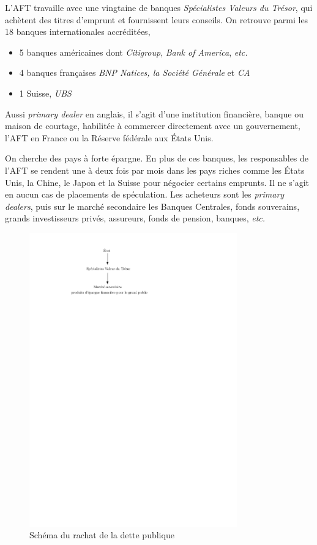 \documentclass[main.tex]{subfiles}
\begin{document}
L'AFT travaille avec une vingtaine de banques \emph{Spécialistes Valeurs du Trésor}, qui achètent des titres d'emprunt et fournissent leurs conseils. On retrouve parmi les 18 banques internationales accréditées,
\begin{itemize}
        \item 5 banques américaines dont \emph{Citigroup}, \emph{Bank of America}, \textit{etc.}
        \item 4 banques françaises \emph{BNP Natices, la Société Générale} et \emph{CA}
        \item 1 Suisse, \emph{UBS} 
\end{itemize}

\begin{definition}
        Aussi \emph{primary dealer} en anglais, il s'agit d'une institution financière, banque ou maison de courtage, habilitée à commercer directement avec un gouvernement, l'AFT en France ou la Réserve fédérale aux États Unis.
\end{definition}

        On cherche des pays à forte épargne. En plus de ces banques, les responsables de l'AFT se rendent une à deux fois par mois dans les pays riches comme les États Unis, la Chine, le Japon et la Suisse pour négocier certains emprunts.
        Il ne s'agit en aucun cas de placements de spéculation. Les acheteurs sont les \emph{primary dealers}, puis sur le marché secondaire les Banques Centrales, fonds souverains, grands investisseurs privés, assureurs, fonds de pension, banques, \textit{etc.} 

        \begin{figure}[ht]
                \centering
                \includegraphics[width=0.8\textwidth]{dette.pdf}
                \caption{Schéma du rachat de la dette publique}
                \label{fig:dette}
        \end{figure}
\end{document}
